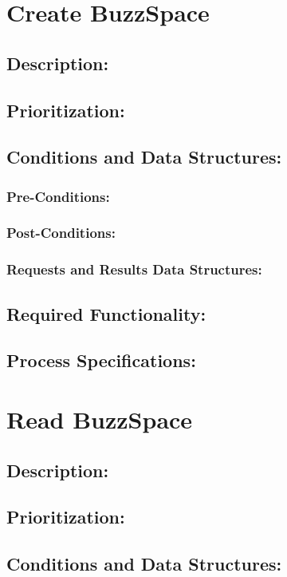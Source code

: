 \documentclass[a4paper,11pt]{article}
\begin{document}
\section{Create BuzzSpace}
\subsection*{Description:}
\subsection{Prioritization:}
\subsection{Conditions and Data Structures:}
\subsubsection*{Pre-Conditions:}
\subsubsection*{Post-Conditions:}
\subsubsection*{Requests and Results Data Structures:}
\subsection{Required Functionality:} 
\subsection{Process Specifications:} 

\section{Read BuzzSpace}
\subsection*{Description:}
\subsection{Prioritization:} 
\subsection{Conditions and Data Structures:}
\end{document}
